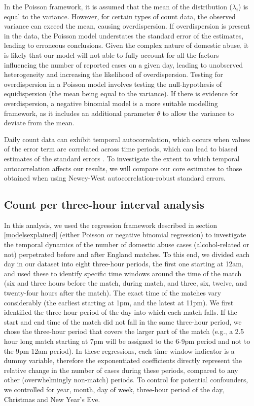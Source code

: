 \documentclass[12pt, a4paper]{article}
\begin{document}
In the Poisson framework, it is assumed that the mean of the distribution ($\lambda_i$) is equal to the variance.
However, for certain types of count data, the observed variance can exceed the mean, causing overdispersion.
If overdispersion is present in the data, the Poisson model understates the standard error of the estimates, leading to erroneous conclusions.
Given the complex nature of domestic abuse, it is likely that our model will not able to fully account for all the factors influencing the number of reported cases on a given day, leading to unobserved heterogeneity and increasing the likelihood of overdispersion.
Testing for overdispersion in a Poisson model involves testing the null-hypothesis of equidispersion (the mean being equal to the variance).
If there is evidence for overdispersion, a negative binomial model is a more suitable modelling framework, as it includes an additional parameter $\theta$ to allow the variance to deviate from the mean.

Daily count data can exhibit temporal autocorrelation, which occurs when values of the error term are correlated across time periods, which can lead to biased estimates of the standard errors \cite{Greene2002}. To investigate the extent to which temporal autocorrelation affects our results, we will compare our core estimates to those obtained when using Newey-West autocorrelation-robust standard errors.


\subsection{Count per three-hour interval analysis}

In this analysis, we used the regression framework described in section \ref{modelsexplained} (either Poisson or negative binomial regression) to investigate the temporal dynamics of the number of domestic abuse cases (alcohol-related or not) perpetrated before and after England matches. To this end, we divided each day in our dataset into eight three-hour periods, the first one starting at 12am, and used these to identify specific time windows around the time of the match (six and three hours before the match, during match, and three, six, twelve, and twenty-four hours after the match). The exact time of the matches vary considerably (the earliest starting at 1pm, and the latest at 11pm). We first identified the three-hour period of the day into which each match falls. If the start and end time of the match did not fall in the same three-hour period, we chose the three-hour period that covers the larger part of the match (e.g., a 2.5 hour long match starting at 7pm will be assigned to the 6-9pm period and not to the 9pm-12am period). In these regressions, each time window indicator is a dummy variable, therefore the exponentiated coefficients directly represent the relative change in the number of cases during these periods, compared to any other (overwhelmingly non-match) periods. To control for potential confounders, we controlled for year, month, day of week, three-hour period of the day, Christmas and New Year's Eve.
\end{document}
